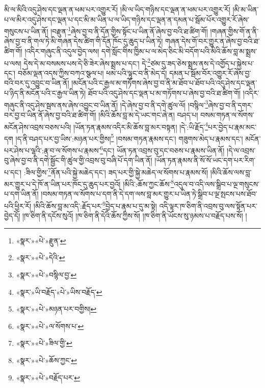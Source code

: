 མི་ལ་མིའི་འདུ་ཤེས་དང་ལྡན་ན་ཕམ་པར་འགྱུར་རོ། །མི་ལ་ཡིད་གཉིས་དང་ལྡན་ན་ཕམ་པར་འགྱུར་རོ། །མི་མ་ཡིན་པ་ལ་མིར་འདུ་ཤེས་དང་ལྡན་པ་དང་མི་མ་ཡིན་པ་ལ་ཡིད་གཉིས་དང་ལྡན་ན་དམན་པ་སྦོམ་པོར་འགྱུར་རོ་ཞེས་གསུངས་པ་ཡིན་ནོ། །བརྫུན་\footnote{«སྣར་»«པེ་»རྫུན་}ཞེས་བྱ་བ་ནི་དོན་གྱིས་སྟོང་པ་ཡིན་ནོ་ཞེས་བྱ་བའི་ཐ་ཚིག་གོ། །གཞན་གྱིས་གོ་ན་ནི་ཞེས་བྱ་བ་ནི་གལ་ཏེ་མི་གཞན་དེས་ཚིག་གི་དོན་ཁོང་དུ་ཆུད་པ་ཡིན་ཏེ། གཞན་དེས་གོ་བར་གྱུར་ན་ཞེས་བྱ་བའི་ཐ་ཚིག་གོ། །འདིར་གཞུང་ནི་འདུལ་བྱེད་ལས། དགེ་སློང་གིས་ཁྱིམ་པ་ལ་མེད་ཅིང་མི་བདོག་པའི་མིའི་ཆོས་བླ་མ་སྨྲས་པ་ལས། དེས་དེ་མ་བསམས་པས་དེ་ཅི་ཟེར་ཞེས་སྨྲས་པ་དང་། དེ་\footnote{«སྣར་»«པེ་»དེའི་}ཙམ་དུ་ཟད་ཅེས་སྨྲས་ནས་དེ་འགྱོད་པ་སྐྱེས་པ་དང་། བཅོམ་ལྡན་འདས་ཀྱིས་བཀའ་སྩལ་པ། ཕམ་པའི་ལྟུང་བ་ནི་མེད་དེ། དམན་པ་སྦོམ་བོར་འགྱུར་རོ་ཞེས་བྱ་བའི་བར་དུ་འབྱུང་བ་ཡིན་ནོ། །མངོན་པའི་ང་རྒྱལ་མ་གཏོགས་ཞེས་བྱ་བ་ནི་མ་ཐོབ་པ་ཐོབ་པའི་འདུ་ཤེས་དང་ལྡན་པ་ཉིད་ནི་མངོན་པའི་ང་རྒྱལ་ཡིན་ཏེ། ཐོབ་པའི་འདུ་ཤེས་དང་ལྡན་པ་མ་གཏོགས་པ་ཞེས་བྱ་བའི་ཐ་ཚིག་གོ། །འདིར་གཞུང་ནི་འདུ་ཤེས་སྦས་ནས་ཞེས་འབྱུང་བ་ཡིན་ནོ། །དེ་ཞེས་བྱ་བ་ནི་དགེ་ཚུལ་ལོ། །བསྙིལ་\footnote{«སྣར་»«པེ་»བསྙིལ་བྱ་}ཞེས་བྱ་བ་ནི་དགར་བར་བྱ་བ་ཡིན་ནོ་ཞེས་བྱ་བའི་ཐ་ཚིག་གོ། །མིའི་ཆོས་བླ་མ་དེ་ཡང་གང་ཞེ་ན། བཤད་པ། བསམ་གཏན་ལ་སོགས་མངོན་ཤེས་འབྲས་བཅས་པའི། །ཡོན་ཏན་རྣམས་འདིར་མི་ཆོས་བླ་མར་བསྟན། །དེ་:ཡི་རྗོད་\footnote{«སྣར་»ཡི་བརྗོད་«པེ་»ཡིས་བརྗོད་}པར་བྱེད་པ་རྣམ་མང་དག །ད་ནི་བཤད་པར་བྱ་ཡིས་:མཉན་པར་གྱིས།\footnote{«སྣར་»«པེ་»མཉན་པར་བགྱིས།} །བསམ་གཏན་རྣམས་དང་། གཟུགས་མེད་པ་རྣམས་དང་། མངོན་པར་ཤེས་པ་ལྷའི་:རྣ་བ་ལ་སོགས་པ་རྣམས་\footnote{«སྣར་»«པེ་»ལ་སོགས་པ་}དང་། ཡོན་ཏན་འབྲས་བུ་དང་བཅས་པ་རྣམས་ཡིན་ནོ། །དེ་ལ་འབྲས་བུ་ཞེས་བྱ་བ་ནི་དགེ་སྦྱོང་གི་ཚུལ་གྱི་འབྲས་བུ་བཞི་པོ་དག་ཡིན་ནོ། །ཡོན་ཏན་རྣམས་ནི་སོ་སོ་ཡང་དག་པར་རིག་པ་དང་། :ཟིལ་གྱིས་\footnote{«སྣར་»«པེ་»ཟིལ་གྱི་}ནོན་པའི་སྐྱེ་མཆེད་དང་། ཟད་པར་གྱི་སྐྱེ་མཆེད་ལ་སོགས་པ་རྣམས་སོ། །མིའི་ཆོས་ལས་བླ་མར་གྱུར་པ་དེ་ཁོ་ན་ཡིན་པར་ཁོང་དུ་ཆུད་པར་བྱའོ། །མིའི་:ཆོས་ཀྱང་ཆོས་\footnote{«སྣར་»«པེ་»ཆོས་ཀྱང་}འདུལ་བ་འདི་ལས་སྒྲིབ་པ་ལྔ་གསུངས་པ་དག་ཡིན་ནོ། །བསམ་གཏན་ལ་སོགས་པ་དག་ནི་དེ་དག་ལས་བླ་མར་གྱུར་པ་ཡིན་ཏེ་སྒྲིབ་པ་ལྔ་སྤངས་པས་ཐོབ་པའི་ཕྱིར་རོ། །མིའི་ཆོས་བླ་མ་འདི་:རྗོད་པར་\footnote{«སྣར་»«པེ་»བརྗོད་པར་}བྱེད་པ་རྣམ་པ་དུ་མ་སྟེ། འདི་ལྟར་ཁ་ཅིག་ནི་འབྲས་བུ་ལས་སྟོན་པར་བྱེད་དོ། །ཁ་ཅིག་ནི་དངོས་སུའོ། །ཁ་ཅིག་ནི་དེའི་ཆོས་ཀྱིས་སོ། །ཁ་ཅིག་ནི་ཡོངས་སུ་ཉམས་པ་བརྗོད་པས་སོ། །
